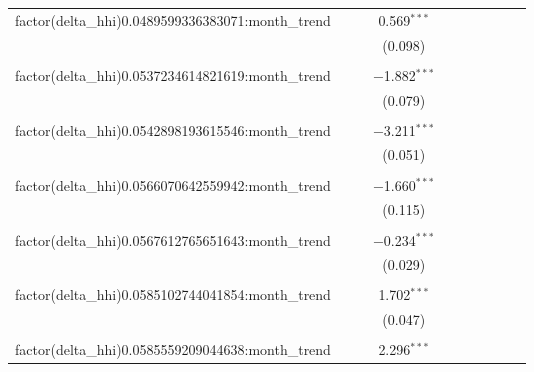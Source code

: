 \begin{table}[H]
{\begin{tabular}{@{\extracolsep{5pt}}lccccccccc}
  factor(delta\_hhi)0.0489599336383071:month\_trend &  &  & 0.569$^{***}$ &  &  &  &  &  &  \\  

   &  &  & (0.098) &  &  &  &  &  &  \\  

   & & & & & & & & & \\  

  factor(delta\_hhi)0.0537234614821619:month\_trend &  &  & $-$1.882$^{***}$ &  &  &  &  &  &  \\  

   &  &  & (0.079) &  &  &  &  &  &  \\  

   & & & & & & & & & \\  

  factor(delta\_hhi)0.0542898193615546:month\_trend &  &  & $-$3.211$^{***}$ &  &  &  &  &  &  \\  

   &  &  & (0.051) &  &  &  &  &  &  \\  

   & & & & & & & & & \\  

  factor(delta\_hhi)0.0566070642559942:month\_trend &  &  & $-$1.660$^{***}$ &  &  &  &  &  &  \\  

   &  &  & (0.115) &  &  &  &  &  &  \\  

   & & & & & & & & & \\  

  factor(delta\_hhi)0.0567612765651643:month\_trend &  &  & $-$0.234$^{***}$ &  &  &  &  &  &  \\  

   &  &  & (0.029) &  &  &  &  &  &  \\  

   & & & & & & & & & \\  

  factor(delta\_hhi)0.0585102744041854:month\_trend &  &  & 1.702$^{***}$ &  &  &  &  &  &  \\  

   &  &  & (0.047) &  &  &  &  &  &  \\  

   & & & & & & & & & \\  

  factor(delta\_hhi)0.0585559209044638:month\_trend &  &  & 2.296$^{***}$ &  &  &  &  &  &  \\  


\end{tabular}}
\end{table}
